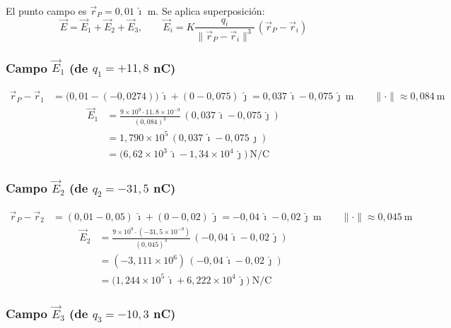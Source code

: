\documentclass[12pt,letterpaper]{article}
\begin{document}
El punto campo es $\vec{r}_P = 0{,}01\,\hat{\imath}$ m. Se aplica superposición:
\[
    \vec{E} = \vec{E}_1 + \vec{E}_2 + \vec{E}_3,
    \qquad \vec{E}_i = K\frac{q_i}{\|\vec{r}_P - \vec{r}_i\|^3}\,(\vec{r}_P - \vec{r}_i)
\]

\subsubsection*{Campo $\vec{E}_1$ (de $q_1 = +11{,}8$ nC)}

\begin{align*}
    \vec{r}_P - \vec{r}_1 &= \bigl(0{,}01-(-0{,}0274)\bigr)\,\hat{\imath} + (0-0{,}075)\,\hat{\jmath}
        = 0{,}037\,\hat{\imath} - 0{,}075\,\hat{\jmath}\ \text{m}
        \qquad \|\cdot\| \approx 0{,}084\ \text{m}
\end{align*}
\begin{align*}
    \vec{E}_1 &= \frac{9\times10^9\cdot11{,}8\times10^{-9}}{(0{,}084)^3}
               \,(0{,}037\,\hat{\imath}-0{,}075\,\hat{\jmath})\\
              &= 1{,}790\times10^5\,(0{,}037\,\hat{\imath}-0{,}075\,\hat{\jmath})\\
              &= \bigl(6{,}62\times10^{3}\,\hat{\imath} - 1{,}34\times10^{4}\,\hat{\jmath}\bigr)\ \text{N/C}
\end{align*}

\subsubsection*{Campo $\vec{E}_2$ (de $q_2 = -31{,}5$ nC)}

\begin{align*}
    \vec{r}_P - \vec{r}_2 &= (0{,}01-0{,}05)\,\hat{\imath} + (0-0{,}02)\,\hat{\jmath}
        = -0{,}04\,\hat{\imath} - 0{,}02\,\hat{\jmath}\ \text{m}
        \qquad \|\cdot\| \approx 0{,}045\ \text{m}
\end{align*}
\begin{align*}
    \vec{E}_2 &= \frac{9\times10^9\cdot(-31{,}5\times10^{-9})}{(0{,}045)^3}
               \,(-0{,}04\,\hat{\imath}-0{,}02\,\hat{\jmath})\\
              &= (-3{,}111\times10^6)\,(-0{,}04\,\hat{\imath}-0{,}02\,\hat{\jmath})\\
              &= \bigl(1{,}244\times10^{5}\,\hat{\imath} + 6{,}222\times10^{4}\,\hat{\jmath}\bigr)\ \text{N/C}
\end{align*}

\subsubsection*{Campo $\vec{E}_3$ (de $q_3 = -10{,}3$ nC)}
\end{document}
